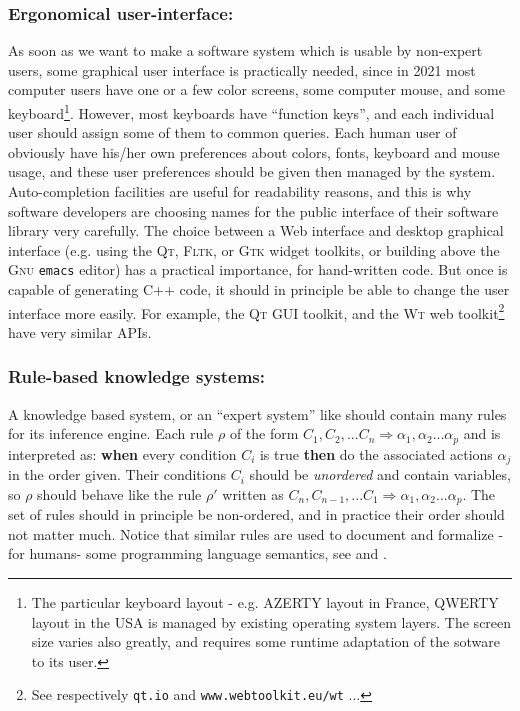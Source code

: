 \documentclass{svproc}
\begin{document}
\subsubsection{Ergonomical user-interface:} As soon as we want to make
a software system which is usable by non-expert users, some graphical
user interface is practically needed, since in 2021 most computer
users have one or a few color screens, some computer mouse, and some
keyboard\footnote{The particular keyboard layout - e.g. AZERTY layout
in France, QWERTY layout in the USA is managed by existing operating
system layers. The screen size varies also greatly, and requires some
runtime adaptation of the sotware to its user.}. However, most
keyboards have ``function keys'', and each individual user should
assign some of them to common queries. Each human user of \RefPerSys{}
obviously have his/her own preferences about colors, fonts, keyboard
and mouse usage, and these user preferences should be given then
managed by the system. Auto-completion facilities are useful for
readability reasons, and this is why software developers are choosing
names for the public interface of their software library very
carefully. The choice between a Web interface and desktop graphical
interface (e.g. using the \textsc{Qt}, \textsc{Fltk}, or \textsc{Gtk}
widget toolkits, or building above the \textsc{Gnu} \texttt{emacs}
editor) has a practical importance, for hand-written code. But once
\RefPerSys{} is capable of generating C++ code, it should in principle
be able to change the user interface more easily. For example, the
\textsc{Qt} GUI toolkit, and the \textsc{Wt} web toolkit\footnote{See
respectively {\texttt{qt.io}} and {\texttt{www.webtoolkit.eu/wt}} ...}
have very similar APIs.

\subsubsection{Rule-based knowledge systems:} A knowledge based system, or an ``expert system''
like \RefPerSys{} should contain many rules for its inference
engine. Each rule $\rho$ of the form $C_1, C_2, ... C_n \Rightarrow
\alpha_1, \alpha_2 ... \alpha_p$ and is interpreted as: \textbf{when}
every condition $C_i$ is true \textbf{then} do the associated actions
$\alpha_j$ in the order given.  Their conditions $C_i$ should be
\textit{unordered} and contain variables, so $\rho$ should behave like
the rule $\rho'$ written as $C_n, C_{n-1}, ... C_1 \Rightarrow
\alpha_1, \alpha_2 ... \alpha_p$.  The set of rules should in
principle be non-ordered, and in practice their order should not
matter much.  Notice that similar rules are used to document and
formalize -for humans- some programming language semantics, see
\cite{pierce:2002:types} and \cite{pierce:2005:advanced}.
\end{document}
